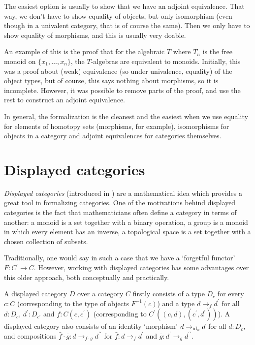The easiest option is usually to show that we have an adjoint equivalence. That way, we don't have to show equality of objects, but only isomorphism (even though in a univalent category, that is of course the same). Then we only have to show equality of morphisms, and this is usually very doable.

An example of this is the proof that for the algebraic $ T $ where $ T_n $ is the free monoid on $ \{ x_1, \dots, x_n \} $, the $ T $-algebras are equivalent to monoids. Initially, this was a proof about (weak) equivalence (so under univalence, equality) of the object types, but of course, this says nothing about morphisms, so it is incomplete. However, it was possible to remove parts of the proof, and use the rest to construct an adjoint equivalence.

In general, the formalization is the cleanest and the easiest when we use equality for elements of homotopy sets (morphisms, for example), isomorphisms for objects in a category and adjoint equivalences for categories themselves.

\section{Displayed categories}\label{sec:displayed-categories}

\textit{Displayed categories} (introduced in \autocite{displayed-categories}) are a mathematical idea which provides a great tool in formalizing categories. One of the motivations behind displayed categories is the fact that mathematicians often define a category in terms of another: a monoid is a set together with a binary operation, a group is a monoid in which every element has an inverse, a topological space is a set together with a chosen collection of subsets.

Traditionally, one would say in such a case that we have a `forgetful functor' $ F : C^\prime \to C $. However, working with displayed categories has some advantages over this older approach, both conceptually and practically.

A displayed category $ D $ over a category $ C $ firstly consists of a type $ D_c $ for every $ c : C $ (corresponding to the type of objects $ F^{-1}(c) $) and a type $ d \to_f d^\prime $ for all $ d: D_c $, $ d^\prime : D_{c^\prime} $ and $ f : C(c, c^\prime) $ (corresponding to $ C^\prime((c, d), (c^\prime, d^\prime)) $). A displayed category also consists of an identity `morphism' $ d \to_{\text{id}_{c}} d $ for all $ d : D_c $, and compositions $ \bar f \cdot \bar g : d \to_{f \cdot g} d^{\prime \prime} $ for $ \bar f : d \to_f d^\prime $ and $ \bar g : d^\prime \to_g d^{\prime \prime} $.

